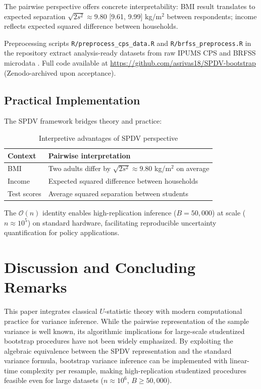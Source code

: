 \documentclass[12pt,a4paper]{article}
\begin{document}
The pairwise perspective offers concrete interpretability: BMI result translates to expected separation $\sqrt{2s^2}\approx9.80$ [9.61, 9.99] kg/m$^2$ between respondents; income reflects expected squared difference between households.

Preprocessing scripts \texttt{R/preprocess\_cps\_data.R} and \texttt{R/brfss\_preprocess.R} in the repository extract analysis-ready datasets from raw IPUMS CPS and BRFSS microdata \citep{flood2023ipums}. Full code available at \url{https://github.com/asrivas18/SPDV-bootstrap} (Zenodo-archived upon acceptance).

\subsection{Practical Implementation}
The SPDV framework bridges theory and practice:

\begin{table}[htbp]
\centering
\caption{Interpretive advantages of SPDV perspective}
\label{tab:interpretive}
\begin{tabular}{@{}ll@{}}
\toprule
Context & Pairwise interpretation \\
\midrule
BMI & Two adults differ by $\sqrt{2s^2}\approx9.80$ kg/m$^2$ on average \\
Income & Expected squared difference between households \\
Test scores & Average squared separation between students \\
\bottomrule
\end{tabular}
\end{table}

\noindent The $\mathcal{O}(n)$ identity enables high-replication inference ($B=50{,}000$) at scale ($n\approx10^5$) on standard hardware, facilitating reproducible uncertainty quantification for policy applications.

\section{Discussion and Concluding Remarks}
\label{sec:discussion}

This paper integrates classical $U$-statistic theory with modern computational practice for variance inference. While the pairwise representation of the sample variance is well known, its algorithmic implications for large-scale studentized bootstrap procedures have not been widely emphasized. By exploiting the algebraic equivalence between the SPDV representation and the standard variance formula, bootstrap variance inference can be implemented with linear-time complexity per resample, making high-replication studentized procedures feasible even for large datasets ($n \approx 10^6$, $B \ge 50{,}000$).
\end{document}

